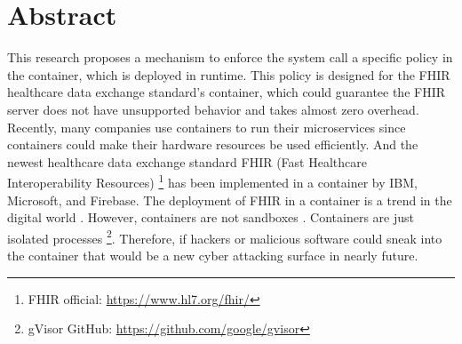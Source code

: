 \chapter*{Abstract}

This research proposes
a mechanism to enforce the system call a specific policy in the container, which is deployed in
runtime. This policy is designed for the FHIR healthcare data exchange standard's container, which
could guarantee the FHIR server does not have unsupported behavior and takes almost zero overhead.
Recently, many companies use containers to run their microservices since containers could
make their hardware resources be used efficiently. And the newest healthcare data exchange
standard FHIR (Fast Healthcare Interoperability Resources) 
\footnote{{FHIR official:  \href{https://www.hl7.org/fhir/}{https://www.hl7.org/fhir/}}} has been implemented
in a container by IBM, Microsoft, and Firebase. The deployment of FHIR in a container is a trend
in the digital world \cite{8473370}. However, containers are not sandboxes \cite{10.5555/1267569.1267570}
. Containers are just isolated processes \footnote{gVisor GitHub: \url{https://github.com/google/gvisor}}.
Therefore, if hackers or malicious software could sneak
into the container that would be a new cyber attacking surface in nearly future.